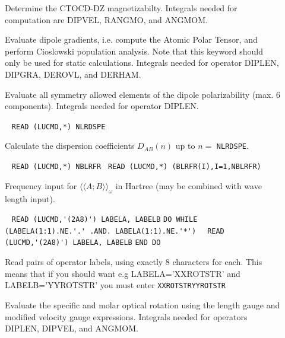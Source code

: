 \begin{description}
\item[]
Determine the CTOCD-DZ magnetizabilty. Integrals needed for 
computation are DIPVEL, RANGMO, and ANGMOM.

\item[]
Evaluate dipole gradients, i.e. compute the Atomic Polar Tensor, and
perform Cioslowski population analysis. Note that this keyword should
only be used for static calculations.
Integrals needed for operator DIPLEN, DIPGRA, DEROVL, and DERHAM.
 
\item[] 
Evaluate all symmetry allowed elements of the dipole polarizability
(max. 6 components).
Integrals needed for operator DIPLEN.

\item[] \verb| |\newline
   \verb|READ (LUCMD,*) NLRDSPE|

   Calculate the dispersion coefficients 
   $D_{AB}(n)$ up to $n = $ \verb+NLRDSPE+.

\item[] \verb| |\newline
   \verb|READ (LUCMD,*) NBLRFR |\newline
   \verb|READ (LUCMD,*) (BLRFR(I),I=1,NBLRFR)|

Frequency input for $\langle\langle A;B \rangle\rangle_{\omega}$ in
Hartree (may be combined with wave length input).

%
%
%
\item[] \verb| |\newline
   \verb|READ (LUCMD,'(2A8)') LABELA, LABELB|\newline
   \verb|DO WHILE (LABELA(1:1).NE.'.' .AND. LABELA(1:1).NE.'*')|\newline
   \verb|  READ (LUCMD,'(2A8)') LABELA, LABELB|\newline
   \verb|END DO|

Read pairs of operator labels, using exactly 8 characters for each. 
This means that if you should want e.g LABELA='XXROTSTR' and LABELB='YYROTSTR'
you must enter\newline
\verb|XXROTSTRYYROTSTR|


\item[] 
Evaluate the specific and molar optical rotation using the length gauge
and modified velocity gauge
expressions.
Integrals needed for operators DIPLEN, DIPVEL, and ANGMOM.


\end{description}
